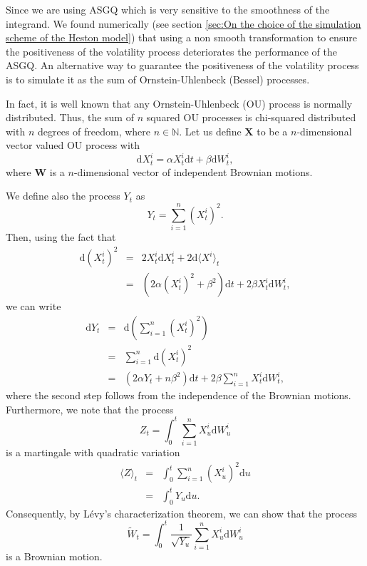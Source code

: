 \documentclass[11pt]{article}
\newcommand{\nset}{\mathbb{N}}
\begin{document}
Since we are using ASGQ which is very sensitive to the smoothness of the integrand. We found numerically (see section \ref{sec:On the choice of the simulation scheme of the Heston model}) that using a non smooth transformation to ensure the positiveness of the volatility process deteriorates the performance of the ASGQ. An alternative way to guarantee the positiveness of the volatility process is to simulate it as  the sum of  Ornstein-Uhlenbeck (Bessel) processes.

In fact, it is well known that any Ornstein-Uhlenbeck (OU) process is normally distributed. Thus, the sum of $n$ squared OU processes is chi-squared distributed with $n$ degrees of freedom, where $n \in \nset$. Let us define $\mathbf{X}$ to be a $n$-dimensional vector valued OU process with
\begin{equation}\label{equivalent OU process} 
\mathrm{d}X_t^i = \alpha X_t^i \mathrm{d}t + \beta \mathrm{d}W_t^i,
\end{equation}
where $\mathbf{W}$ is a $n$-dimensional vector of independent Brownian motions. 

We define also the process $Y_t$ as  
\begin{equation}
Y_t = \sum_{i = 1}^n \left( X_t^i \right)^2.
\end{equation}
Then, using the fact that
\begin{eqnarray}
\mathrm{d} \left( X_t^i \right)^2 & = & 2 X_t^i \mathrm{d}X_t^i + 2 \mathrm{d} \langle X^i \rangle_t \nonumber\\
& = & \left( 2 \alpha \left( X_t^i \right)^2 + \beta^2 \right) \mathrm{d}t + 2 \beta X_t^i \mathrm{d}W_t^i,
\end{eqnarray}
we can write
\begin{eqnarray}\label{eq:expressing CIR processes from OU processes}
\mathrm{d}Y_t & = & \mathrm{d} \left( \sum_{i = 1}^n \left( X_t^i \right)^2 \right) \nonumber\\
& = & \sum_{i = 1}^n \mathrm{d} \left( X_t^i \right)^2 \nonumber\\
& = & \left( 2 \alpha Y_t + n \beta^2 \right) \mathrm{d}t + 2 \beta \sum_{i = 1}^n X_t^i \mathrm{d}W_t^i,
\end{eqnarray}
where the second step follows from the independence of the Brownian motions. Furthermore, we  note that the process
\begin{equation}
Z_t = \int_0^t \sum_{i = 1}^n X_u^i \mathrm{d}W_u^i
\end{equation}
is a martingale with quadratic variation
\begin{eqnarray}
\langle Z \rangle_t & = & \int_0^t \sum_{i = 1}^n \left( X_u^i \right)^2 \mathrm{d}u \nonumber\\
& = & \int_0^t Y_u \mathrm{d}u.
\end{eqnarray}
Consequently, by L\'evy's characterization theorem, we can show that the process
\begin{equation}
\widetilde{W}_t = \int_0^t \frac{1}{\sqrt{Y_u}} \sum_{i = 1}^n X_u^i \mathrm{d}W_u^i
\end{equation}
is a Brownian motion.
\end{document}
